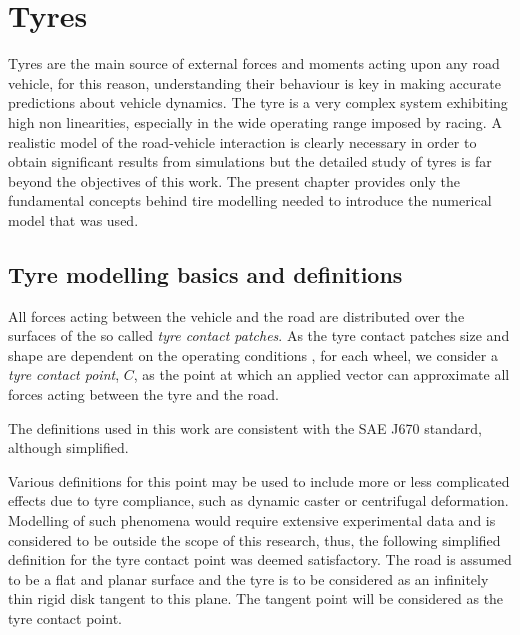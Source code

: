 \chapter{Tyres}
\label{chap:tyres}
Tyres are the main source of external forces and moments acting upon any road vehicle\cite{milliken1995race}, for this reason, understanding their behaviour is key in making accurate predictions about vehicle dynamics. The tyre is a very complex system exhibiting high non linearities, especially in the wide operating range imposed by racing.
A realistic model of the road-vehicle interaction is clearly necessary in order to obtain significant results from simulations but the detailed study of tyres is far beyond the objectives of this work.
The present chapter provides only the fundamental concepts behind tire modelling needed to introduce the numerical model that was used.
\section{Tyre modelling basics and definitions}
\label{sec:tyrebasics}
All forces acting between the vehicle and the road are distributed over the surfaces of the so called \textit{tyre contact patches}. As the tyre contact patches size and shape are dependent on the operating conditions \cite{pac2012}, for each wheel, we consider a \textit{tyre contact point}, $C$, as the point at which an applied vector can approximate all forces acting between the tyre and the road.

The definitions used in this work are consistent with the SAE J670 standard, although simplified.

Various definitions for this point may be used to include more or less complicated effects due to tyre compliance, such as dynamic caster or centrifugal deformation.
Modelling of such phenomena would require extensive experimental data and is considered to be outside the scope of this research, thus, the following simplified definition for the tyre contact point was deemed satisfactory. The road is assumed to be a flat and planar surface and the tyre is to be considered as an infinitely thin rigid disk tangent to this plane.  The tangent point will be considered as the tyre contact point.

